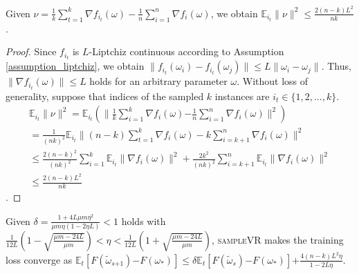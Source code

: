 \documentclass[letterpaper]{article}
\begin{document}
\begin{Lemma}
\label{lemma_nu}
Given $\nu = \frac{1}{k}\sum\limits_{t=1}^k  \nabla f_{i_t}(\omega) - \frac{1}{n}\sum\limits_{i=1}^n \nabla f_i(\omega)$, we obtain
$\mathbb{E}_{i_t}\parallel \nu  \parallel^2 \le \frac{2(n-k)L^2}{nk}$.
\end{Lemma}
\begin{proof}
Since $f_{i_t}$ is $L$-Liptchiz continuous according to Assumption \ref{assumption_liptchiz},  we obtain $\parallel  f_{i_t}(\omega_i) - f_{i_t}(\omega_j)  \parallel \le L \parallel \omega_i - \omega_j    \parallel$. Thus, $\parallel \nabla f_{i_t}(\omega) \parallel \le L$ holds for an arbitrary parameter $\omega$.
Without loss of generality, suppose that indices of the sampled $k$ instances are $i_t\in\{1,2, ..., k\}$.
\begin{equation}
\begin{array}{ll}
\mathbb{E}_{i_t}\parallel \nu  \parallel^2 
= \mathbb{E}_{i_t}\left( \parallel \frac{1}{k}\sum\limits_{i=1}^k  \nabla f_{i}(\omega) \mathrm{-} \frac{1}{n}\sum\limits_{i=1}^n \nabla f_i(\omega) \parallel^2  \right)    \\
= \frac{1}{(nk)^2}  \mathbb{E}_{i_t}\parallel  (n-k)\sum\limits_{t=1}^k \nabla f_{i}(\omega)-k \sum\limits_{i=k+1}^n \nabla f_{i}(\omega) \parallel^2      \\
\le  \frac{2(n-k)^2}{(nk)^2}  \sum\limits_{i=1}^k \mathbb{E}_{i_t} \parallel  \nabla f_{i}(\omega) \parallel^2  + \frac{2k^2}{(nk)^2}  \sum\limits_{i=k+1}^{n} \mathbb{E}_{i_t} \parallel  \nabla f_{i}(\omega) \parallel^2    \\
\le \frac{2(n-k)L^2}{nk}
\end{array} 
\end{equation}.  
\end{proof}
\begin{Theorem}
\label{Theorem_converge}
Given $\delta=\frac{1+4L\mu m \eta^2}{  \mu m \eta (1-2\eta L)  } < 1$ holds with $\frac{1}{12L}\left( 1- \sqrt{\frac{\mu m - 24L}{\mu m}} \right) < \eta < \frac{1}{12L}\left( 1+ \sqrt{\frac{\mu m - 24L}{\mu m}} \right)$, \textsc{sampleVR} makes the training loss converge as
$\mathbb{E}_t[F(\tilde{\omega}_{s\mathrm{+}1}) \mathrm{-} F(\omega_\ast)]  \le \delta \mathbb{E}_t[F(\tilde{\omega}_s)\mathrm{-}F(\omega_\ast)] \mathrm{+} \frac{4(n-k)L^2\eta}{1-2L\eta}$.
\end{Theorem}
\end{document}
